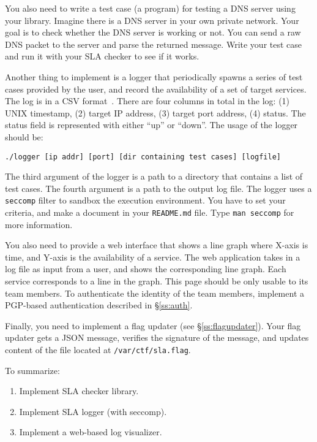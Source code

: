 \documentclass[a4paper, 11pt]{article}
\theoremstyle{definition}
\begin{document}
{You also need to write a test case (a program) for testing a DNS
server using your library. Imagine there is a DNS server in your own
private network. Your goal is to check whether the DNS server is
working or not. You can send a raw DNS packet to the server and parse
the returned message. Write your test case and run it with your SLA
checker to see if it works.

Another thing to implement is a logger that periodically spawns a
series of test cases provided by the user, and record the availability
of a set of target services. The log is in a CSV
format~\cite{csvwiki}. There are four columns in total in the log: (1)
UNIX timestamp, (2) target IP address, (3) target port address, (4)
status. The status field is represented with either ``up'' or
``down''. The usage of the logger should be:
%
\begin{verbatim}
./logger [ip addr] [port] [dir containing test cases] [logfile]
\end{verbatim}
%
The third argument of the logger is a path to a directory that
contains a list of test cases. The fourth argument is a path to the
output log file. The logger uses a \texttt{seccomp} filter to sandbox
the execution environment. You have to set your criteria, and make a
document in your \texttt{README.md} file. Type \texttt{man seccomp}
for more information.

You also need to provide a web interface that shows a line graph where
X-axis is time, and Y-axis is the availability of a service. The web
application takes in a log file as input from a user, and shows the
corresponding line graph. Each service corresponds to a line in the
graph. This page should be only usable to its team members. To
authenticate the identity of the team members, implement a PGP-based
authentication described in \S\ref{ss:auth}.

Finally, you need to implement a flag updater (see
\S\ref{ss:flagupdater}). Your flag updater gets a JSON message,
verifies the signature of the message, and updates content of the file
located at \texttt{/var/ctf/sla.flag}.

To summarize:
\begin{enumerate}

  \item Implement SLA checker library.

  \item Implement SLA logger (with seccomp).

  \item Implement a web-based log visualizer.


\end{enumerate}}
\end{document}
